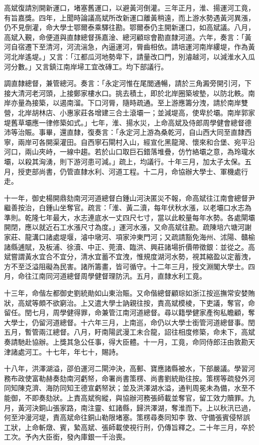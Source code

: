 \begin{pinyinscope}
高斌復請別開新運口，堵塞舊運口，以避黃河倒灌。三年正月，淮、揚運河工竟，有旨嘉獎。四年，上聞時論議高斌所改新運口離黃稍遠，而上游水勢遇黃河異漲，仍不見倒灌，命大學士鄂爾泰乘驛往勘。鄂爾泰仍主開新運口，如高斌議。八月，高斌入覲，命便道與直隸總督孫嘉淦、總河顧琮會勘直隸河道。六年，奏言：「黃河自宿遷下至清河，河流湍急，內逼運河，脣齒相依。請培運河南岸縷堤，作為黃河北岸遙堤。」又言：「江都瓜河地勢卑下，請量改口門，別濬越河，以減淮水入瓜河分數。」又言鎮江南岸埽工宜改磚工。均下部議行。

調直隸總督，兼管總河。奏言：「永定河惟在尾閭通暢，請於三角澱旁開引河，下接大清河老河頭，上接鄭家樓水口。挑去積土，即於北岸圈築坡墊，以防北軼。南岸亦量為接築，以遏南溜。下口河脣，隨時疏通。至上游應籌分洩，請於南岸雙營，北岸胡林店、小惠家莊各增建三合土滾壩一；並減堤高，使卑於壩。南岸郭家堤舊草壩應一律修築如式。」七年，淮、揚水災，上命高斌及侍郎周學健會總督德沛等治賑。事畢，還直隸，復奏言：「永定河上游為桑乾河，自山西大同至直隸西寧，兩岸可各開渠灌田。自西寧石閘村入山，經宣化黑龍灣、懷來和合堡、宛平沿河口，兩山夾峙，一線中趨。若於山口取巨石錯落堆疊，仿竹絡壩之意，為玲瓏水壩，以殺其洶湧，則下游河患可減。」疏上，均議行。十年三月，加太子太保。五月，授吏部尚書，仍管直隸水利、河道工程。十二月，命協辦大學士、軍機處行走。

十一年，御史楊開鼎劾南河河道總督白鍾山河決匿災不報，命高斌往江南會總督尹繼善按治，白鍾山坐奪官。疏言：「淮、黃二瀆，每年伏秋水漲，以老壩口水志為準則。乾隆七年最大，水志連底水一丈四尺七寸，當以此較量每年水勢。各處閘壩開閉，應以就近石工水漲尺寸為度。」運河水漲，又命高斌往勘。疏陳培六塘河謝家莊、龍溝口諸處堤堰，濬中墩河、項家沖東門河；又疏請豁免海州、沭陽、贛榆諸縣逋賦，及板浦、徐瀆、中正、莞瀆、臨洪、興莊諸場折價帶徵銀：並從之。高斌嘗謂黃水宜合不宜分，清水宜蓄不宜洩，惟規度湖河水勢，視其縮盈以定蓄洩，方不至泛溢阻礙為民害。諸所籌畫，皆可循守。十二年三月，授文淵閣大學士。四月，命往江南同河道總督周學健督理防汛。五月，直隸水利工竟。

十三年，命偕左都御史劉統勛如山東治賑。又命偕總督顧琮如浙江按巡撫常安婪賄狀，高斌等頗不欲窮治。上又遣大學士訥親往按，責高斌模棱，下吏議，奪官，命留任。閏七月，周學健得罪，命兼管江南河道總督。尋以籍學健家產徇私瞻顧，奪大學士，仍留河道總督。十六年三月，上南巡，命仍以大學士銜管河道總督事。閏五月，暫管兩江總督。八月，盱南陽武漫工未合龍，詔往相度修築，命未下，高斌奏請馳赴協辦。上獎其急公任事，得大臣體。十一月，工竟，命同侍郎汪由敦勘天津諸處河工。十七年，年七十，賜詩。

十八年，洪澤湖溢，邵伯運河二閘沖決，高郵、寶應諸縣被水，下部嚴議。學習河務布政使富勒赫奏劾南河虧帑，命署尚書策楞、尚書劉統勛往按。策楞等疏發外河同知陳克濟、海防同知王德宣虧帑狀；並及洪澤湖水溢，通判周冕未為備，水至不能御，不即奏劾狀。上責高斌徇縱，與協辦河務張師載並奪官，留工效力贖罪。九月，黃河決銅山張家路，南注靈、虹諸縣，歸洪澤湖，奪淮而下。上以秋汛已過，何至沖漫河堤，責高斌命往銅山勒限堵塞。策楞尋奏同知李敦、守備張賓侵帑誤工狀，上命斬燉、賓，縶高斌、張師載使視行刑，仍傳旨釋之。二十年三月，卒於工次。予內大臣銜，發內庫銀一千治喪。


\end{pinyinscope}
